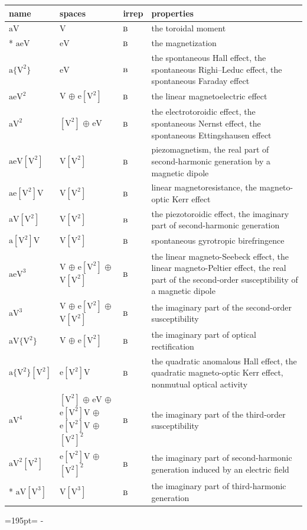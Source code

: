 \documentclass[10pt,a4paper]{article}
\newcommand{\needspace}[1]{\par\penalty-100\begingroup\dimen0=#1\relax\dimen2=\pagegoal
  \advance\dimen2-\pagetotal\ifdim\dimen0>\dimen2\relax\ifdim\dimen2>0pt\vfil\break\fi\fi
  \endgroup}
\numberwithin{equation}{section}
\newcommand{\irr}[1]{\text{\normalfont\scshape #1}}
\newcommand{\jahn}[1]{\mathrm{#1}}
\newlength{\fillwidth}\newlength{\cellwidth}\newlength{\colwidth}
\begin{document}
{\begin{longtable}{@{}lll>{\RaggedRight\arraybackslash}p{\fillwidth}@{}}
name & spaces & irrep & properties\\\midrule\endhead
\bottomrule\endfoot\endlastfoot
$\jahn{aV}$ & $\jahn{V}$ & $\irr{b}$ & the toroidal moment\\*
$\jahn{aeV}$ & $\jahn{eV}$ & $\irr{b}$ & the magnetization\\
$\jahn{a\{V^{2}\}}$ & $\jahn{eV}$ & $\irr{b}$ & the spontaneous Hall effect, the spontaneous Righi–Leduc effect, the spontaneous Faraday effect\\
$\jahn{aeV^{2}}$ & $\jahn{V}$ $\oplus$ $\jahn{e[V^{2}]}$ & $\irr{b}$ & the linear magnetoelectric effect\\
$\jahn{aV^{2}}$ & $\jahn{[V^{2}]}$ $\oplus$ $\jahn{eV}$ & $\irr{b}$ & the electrotoroidic effect, the spontaneous Nernst effect, the spontaneous Ettingshausen effect\\
$\jahn{aeV[V^{2}]}$ & $\jahn{V[V^{2}]}$ & $\irr{b}$ & piezomagnetism, the real part of second-harmonic generation by a magnetic dipole\\
$\jahn{ae[V^{2}]V}$ & $\jahn{V[V^{2}]}$ & $\irr{b}$ & linear magnetoresistance, the magneto-optic Kerr effect\\
$\jahn{aV[V^{2}]}$ & $\jahn{V[V^{2}]}$ & $\irr{b}$ & the piezotoroidic effect, the imaginary part of second-harmonic generation\\
$\jahn{a[V^{2}]V}$ & $\jahn{V[V^{2}]}$ & $\irr{b}$ & spontaneous gyrotropic birefringence\\
$\jahn{aeV^{3}}$ & $\jahn{V}$ $\oplus$ $\jahn{e[V^{2}]}$ $\oplus$ $\jahn{V[V^{2}]}$ & $\irr{b}$ & the linear magneto-Seebeck effect, the linear magneto-Peltier effect, the real part of the second-order susceptibility of a magnetic dipole\\
$\jahn{aV^{3}}$ & $\jahn{V}$ $\oplus$ $\jahn{e[V^{2}]}$ $\oplus$ $\jahn{V[V^{2}]}$ & $\irr{b}$ & the imaginary part of the second-order susceptibility\\
$\jahn{aV\{V^{2}\}}$ & $\jahn{V}$ $\oplus$ $\jahn{e[V^{2}]}$ & $\irr{b}$ & the imaginary part of optical rectification\\
$\jahn{a\{V^{2}\}[V^{2}]}$ & $\jahn{e[V^{2}]V}$ & $\irr{b}$ & the quadratic anomalous Hall effect, the quadratic magneto-optic Kerr effect, nonmutual optical activity\\
$\jahn{aV^{4}}$ & $\jahn{[V^{2}]}$ $\oplus$ $\jahn{eV}$ $\oplus$ $\jahn{e[V^{2}]V}$ $\oplus$ $\jahn{e[V^{2}]V}$ $\oplus$ $\jahn{[V^{2}]^{2}}$ & $\irr{b}$ & the imaginary part of the third-order susceptibility\\
$\jahn{aV^{2}[V^{2}]}$ & $\jahn{e[V^{2}]V}$ $\oplus$ $\jahn{[V^{2}]^{2}}$ & $\irr{b}$ & the imaginary part of second-harmonic generation induced by an electric field\\*
$\jahn{aV[V^{3}]}$ & $\jahn{V[V^{3}]}$ & $\irr{b}$ & the imaginary part of third-harmonic generation\\
\bottomrule\end{longtable}}
\needspace{195pt}
\end{document}
